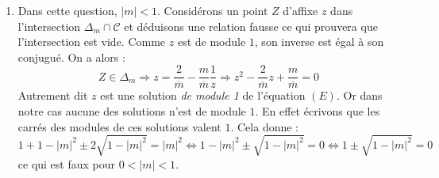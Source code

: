 \begin{enumerate}
 \item Dans cette question, $|m|<1$. Considérons un point $Z$ d'affixe $z$ dans l'intersection $\Delta_m \cap \mathcal C$ et déduisons une relation fausse ce qui prouvera que l'intersection est vide.\newline
Comme $z$ est de module $1$, son inverse est égal à son conjugué. On a alors :
\begin{displaymath}
 Z\in \Delta_m \Rightarrow z=\frac{2}{\overline{m}}-\frac{m}{\overline{m}}\frac{1}{z}
\Rightarrow  z^2 - \frac{2}{\overline{m}}z + \frac{m}{\overline{m}} =0
\end{displaymath}
Autrement dit $z$ est une solution \emph{de module 1} de l'équation $(E)$. Or dans notre cas aucune des solutions n'est de module $1$. En effet écrivons que les carrés des modules de ces solutions valent $1$. Cela donne :
\begin{displaymath}
 1+1-|m|^2 \pm 2\sqrt{1-|m|^2}=|m|^2
\Leftrightarrow
1-|m|^2 \pm \sqrt{1-|m|^2}=0
\Leftrightarrow
1 \pm \sqrt{1-|m|^2} = 0
\end{displaymath}
ce qui est faux pour $0< |m| <1$.


\end{enumerate}
